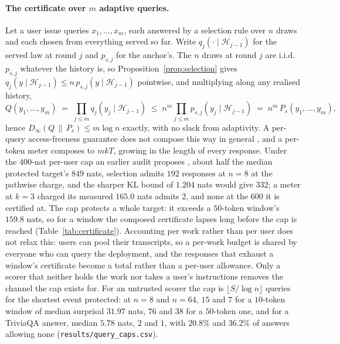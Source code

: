 \paragraph{The certificate over $m$ adaptive queries.}\label{app:compose}
Let a user issue queries $x_1,\dots,x_m$, each answered by a selection rule over $n$ draws and each chosen
from everything served so far. Write $q_j(\cdot \mid \mathcal{H}_{j-1})$ for the served law at round $j$
and $p_{s,j}$ for the anchor's. The $n$ draws at round $j$ are i.i.d.\ $p_{s,j}$ whatever the history is,
so Proposition~\ref{prop:selection} gives $q_j(y \mid \mathcal{H}_{j-1}) \le n\,p_{s,j}(y \mid
\mathcal{H}_{j-1})$ pointwise, and multiplying along any realised history,
\[
  Q(y_1,\dots,y_m) \;=\; \prod_{j \le m} q_j(y_j \mid \mathcal{H}_{j-1})
  \;\le\; n^{m} \prod_{j \le m} p_{s,j}(y_j \mid \mathcal{H}_{j-1}) \;=\; n^{m}\,P_s(y_1,\dots,y_m),
\]
hence $D_\infty(Q \,\|\, P_s) \le m \log n$ exactly, with no slack from adaptivity. A per-query
access-freeness guarantee does not compose this way in general \citep{cohen2025blameless}, and a
per-token meter composes to $mkT$, growing in the length of every response. Under the $400$-nat per-user cap
an earlier audit proposes \citep{vijayavallabh2026audit}, about half the median protected target's $849$
nats, selection admits $192$ responses at $n=8$ at the pathwise charge, and the sharper KL bound of
$1.204$ nats would give $332$; a meter at $k=3$ charged its measured $165.0$ nats admits $2$, and none at
the $600$ it is certified at. The cap protects a whole target: it exceeds a $50$-token window's $159.8$
nats, so for a window the composed certificate lapses long before the cap is reached
(Table~\ref{tab:certificate}). Accounting per work rather than per user does not relax this: users can pool their transcripts, so a per-work budget is shared by everyone who can query the deployment, and the responses that exhaust a window's certificate become a total rather than a per-user allowance. Only a scorer that neither holds the work nor takes a user's instructions removes the channel the cap exists for. For an untrusted scorer the cap is $\lfloor S/\log n\rfloor$ queries for the shortest event protected: at $n=8$ and $n=64$, $15$ and $7$ for a $10$-token window of median surprisal $31.97$ nats, $76$ and $38$ for a $50$-token one, and for a TriviaQA answer, median $5.78$ nats, $2$ and $1$, with $20.8\%$ and $36.2\%$ of answers allowing none (\texttt{results/\allowbreak query\_\allowbreak caps.csv}).

